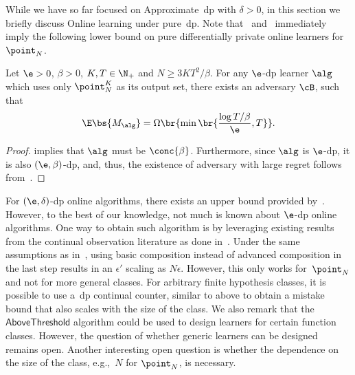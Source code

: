
While we have so far focused on Approximate~\Gls{dp} with \(\delta > 0\), in this section we briefly discuss Online learning under pure~\Gls{dp}. 
Note that~ and~ immediately imply the following lower bound on pure differentially private online learners for \(\point_N\).
\begin{corollary}\label{corr:pure-dp-lower}
    Let \(\e > 0\), \(\beta > 0\), \(K, T \in \N_+\) and \(N \geq 3KT^2 / \beta \).
    For any \(\e\)-\Gls{dp} learner \(\alg\) which uses only \(\point^K_N\) as its output set, 
    there exists an adversary \(\cB\), such that
    \begin{equation}
        \E \bs{M_{\alg}} = \Omega\br{\min\br{\frac{\log T / \beta}{\e}, T}}.
    \end{equation}
\end{corollary}
\begin{proof}
     implies that \(\alg\) must be \(\conc{\beta}\). Furthermore, since \(\alg\) is \(\e\)-\Gls{dp}, it is also \((\e, \beta)\)-\Gls{dp},
    and, thus, the existence of adversary with large regret follows from~.
\end{proof}

For \((\e, \delta)\)-\Gls{dp} online algorithms, there exists an upper bound provided by~\citet{golowich2021littlestone}. 
However, to the best of our knowledge, not much is known about \(\e\)-\Gls{dp} online algorithms. 
One way to obtain such algorithm is by leveraging existing results from the continual observation literature as done in~. 
Under the same assumptions as in~, using basic composition instead of advanced composition in the last step results in an \(\epsilon'\) scaling as \(N\epsilon\). 
However, this only works for~\(\point_N\) and not for more general classes. 
For arbitrary finite hypothesis classes, it is possible to use a~\Gls{dp} continual counter, similar to above to obtain a mistake bound that also scales with the size of the class. We also remark that the \(\mathsf{AboveThreshold}\) algorithm could be used to design learners for certain function classes. However, the question of whether generic learners can be designed remains open. Another interesting open question is whether the dependence on the size of the class, e.g.,~\(N\) for \(\point_N\), is necessary.
